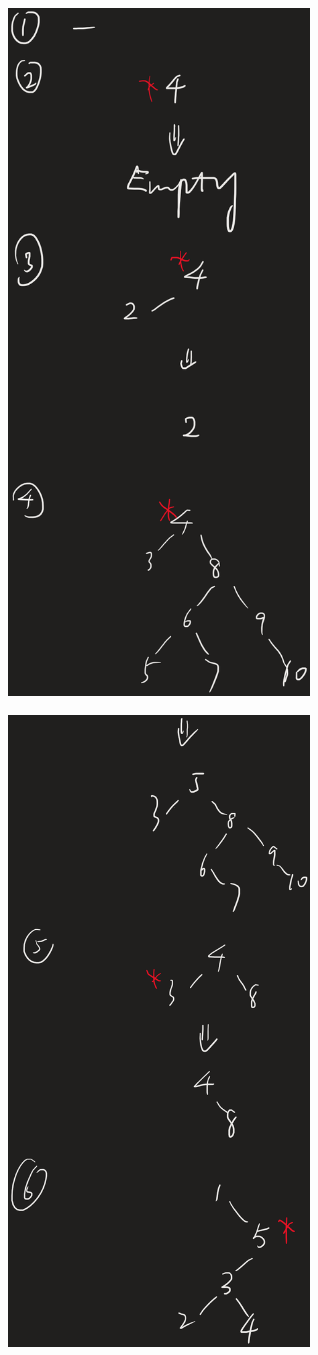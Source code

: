 \documentclass[UTF8]{ctexart}
\begin{document}
\includegraphics[width=0.6\textwidth]{1.png}

\includegraphics[width=0.6\textwidth]{2.png}
\end{document}
